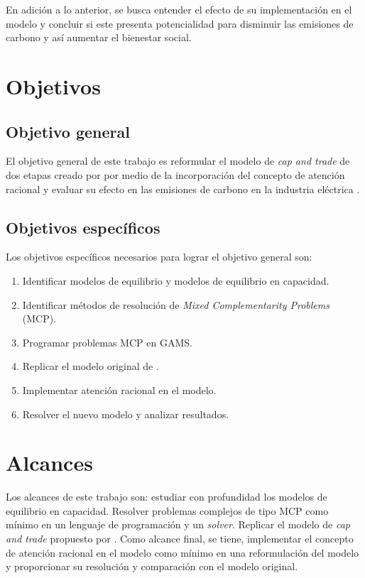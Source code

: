 En adición a lo anterior, se busca entender el efecto de su implementación en el modelo y concluir si este presenta potencialidad para disminuir las emisiones de carbono y así aumentar el bienestar social.


\section{Objetivos}
\subsection{Objetivo general}
El objetivo general de este trabajo es reformular el modelo de \textit{cap and trade} de dos etapas creado por  por medio de la incorporación del concepto de atención racional  y evaluar su efecto en las emisiones de carbono en la industria eléctrica . 

\subsection{Objetivos específicos}
Los objetivos específicos necesarios para lograr el objetivo general son:

\begin{enumerate}
\item Identificar modelos de equilibrio y modelos de equilibrio en capacidad.
\item Identificar métodos de resolución de \emph{Mixed Complementarity Problems} (MCP).
\item Programar problemas MCP en GAMS.
\item Replicar el modelo original de .
\item Implementar atención racional en el modelo.
\item Resolver el nuevo modelo y analizar resultados.
\end{enumerate}


\section{Alcances}

Los alcances de este trabajo son: estudiar con profundidad los modelos de equilibrio en capacidad. Resolver problemas complejos de tipo MCP como mínimo en un lenguaje de programación y un \textit{solver}. Replicar el modelo de \textit{cap and trade} propuesto por . Como alcance final, se tiene, implementar el concepto de atención racional en el modelo como mínimo en una reformulación del modelo y proporcionar su resolución y comparación con el modelo original. 
\vspace{2.5mm}

